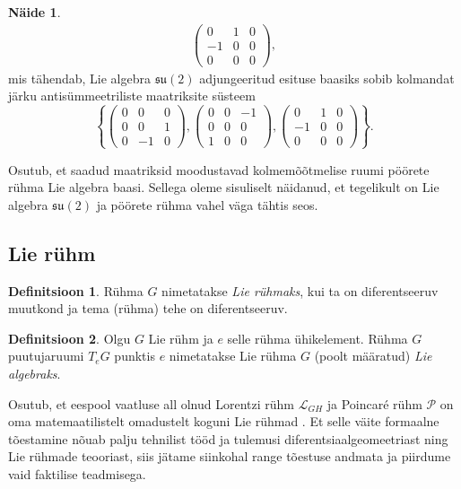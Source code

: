 \documentclass[12pt,a4paper,oneside]{article}
\theoremstyle{plain}
\theoremstyle{definition}
\newtheorem{definitsioon}{Definitsioon}[section]
\newtheorem{naide}{Näide}[section]
\numberwithin{equation}{section}
\def\L{{\mathcal L}}
\def\P{{\mathcal P}}
\def\su2{{\mathfrak{ su}\left(2\right)}}
\begin{document}
\begin{naide}
\begin{align*}
\begin{pmatrix}
0 & 1 & 0 \\
-1 & 0 & 0 \\
0 & 0 & 0
\end{pmatrix},
\end{align*}
mis tähendab, Lie algebra $\su2$ adjungeeritud esituse baasiks sobib 
kolmandat järku antisümmeetriliste maatriksite süsteem 
\[\left\lbrace \begin{pmatrix}
0 & 0 & 0 \\
0 & 0 & 1 \\
0 & -1 & 0
\end{pmatrix}, \begin{pmatrix}
0 & 0 & -1 \\
0 & 0 & 0 \\
1 & 0 & 0
\end{pmatrix}, \begin{pmatrix}
0 & 1 & 0 \\
-1 & 0 & 0 \\
0 & 0 & 0
\end{pmatrix} \right\rbrace.\]
\end{naide}

Osutub, et saadud maatriksid moodustavad kolmemõõtmelise ruumi 
pöörete rühma Lie algebra baasi. Sellega oleme sisuliselt näidanud, 
et tegelikult on Lie algebra $\su2$ ja pöörete rühma vahel väga 
tähtis seos.

\subsection{Lie rühm} \label{ptk:lie_ryhm}

\begin{definitsioon}
Rühma $G$ nimetatakse \emph{Lie rühmaks}, kui ta on diferentseeruv 
muutkond ja tema (rühma) tehe on diferentseeruv.
\end{definitsioon}

\begin{definitsioon}
Olgu $G$ Lie rühm ja $e$ selle rühma ühikelement. Rühma $G$ 
puutujaruumi $T_e G$ punktis $e$ nimetatakse Lie rühma $G$ (poolt 
määratud) \emph{Lie algebraks}.
\end{definitsioon}

Osutub, et eespool vaatluse all olnud Lorentzi rühm $\L_{GH}$ ja 
Poincar\'e rühm $\P$ on oma matemaatilistelt omadustelt koguni Lie 
rühmad \cite[peatükk Poincar\'e algebra]{Super}. Et selle väite 
formaalne tõestamine nõuab palju tehnilist tööd ja tulemusi 
diferentsiaalgeomeetriast ning Lie rühmade teooriast, siis jätame 
siinkohal range tõestuse andmata ja piirdume vaid faktilise 
teadmisega.
\end{document}

